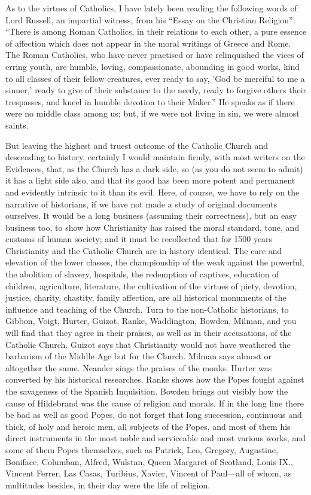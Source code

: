 As to the virtues of Catholics, I have lately
been reading the following words of Lord Russell, an impartial
witness, from his ``Essay on the Christian Religion'': ``There is among
Roman Catholics, in their relations to each other, a pure essence of
affection which does not appear in the moral writings of Greece and
Rome. The Roman Catholics, who have never practised or have
relinquished the vices of erring youth, are humble, loving,
compassionate, abounding in good works, kind to all classes of their
fellow creatures, ever ready to say, 'God be merciful to me a sinner,'
ready to give of their substance to the needy, ready to forgive others
their trespasses, and kneel in humble devotion to their Maker.'' He
speaks as if there were no middle class among us; but, if we were not
living in sin, we were almost saints.

But leaving the highest and truest outcome of the
Catholic Church and descending to history, certainly I would maintain
firmly, with most writers on the Evidences, that, as the Church has a
dark side, so (as you do not seem to admit) it has a light side also,
and that its good has been more potent and permanent and evidently
intrinsic to it than its evil. Here, of course, we have to rely on the
narrative of historians, if we have not made a study of original
documents ourselves. It would be a long business (assuming their
correctness), but an easy business too, to show how Christianity has
raised the moral standard, tone, and customs of human society;
and it must be recollected that for 1500 years Christianity and the
Catholic Church are in history identical. The care and elevation of
the lower classes, the championship of the weak against the powerful,
the abolition of slavery, hospitals, the redemption of captives,
education of children, agriculture, literature, the cultivation of the
virtues of piety, devotion, justice, charity, chastity, family
affection, are all historical monuments of the influence and teaching
of the Church. Turn to the non-Catholic historians, to Gibbon, Voigt,
Hurter, Guizot, Ranke, Waddington, Bowden, Milman, and you will find
that they agree in their praises, as well as in their accusations, of
the Catholic Church. Guizot says that Christianity would not have
weathered the barbarism of the Middle Age but for the Church. Milman
says almost or altogether the same. Neander sings the praises of the
monks. Hurter was converted by his historical researches. Ranke shows
how the Popes fought against the savageness of the Spanish
Inquisition. Bowden brings out visibly how the cause of Hildebrand was
the cause of religion and morals. If in the long line there be bad as
well as good Popes, do not forget that long succession, continuous and
thick, of holy and heroic men, all subjects of the Popes, and most of
them his direct instruments in the most noble and serviceable and most
various works, and some of them Popes themselves, such as Patrick,
Leo, Gregory, Augustine, Boniface, Columban, Alfred, Wulstan, Queen
Margaret of Scotland, Louis IX., Vincent Ferrer, Las Casas, Turibius,
Xavier, Vincent of Paul—all of whom, as multitudes besides, in their
day were the life of religion.

